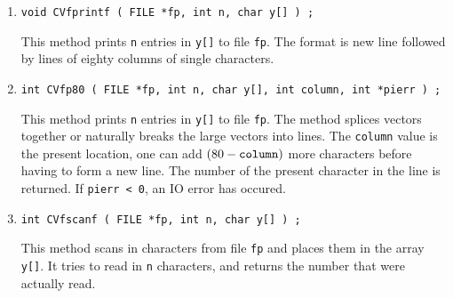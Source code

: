 \begin{enumerate}
{\tt y[i] = c} for {\tt 0 <= i < n}.
\item
\begin{verbatim}
void CVfprintf ( FILE *fp, int n, char y[] ) ;
\end{verbatim}
This method prints {\tt n} entries in {\tt y[]} to file {\tt fp}.
The format is new line followed by lines of eighty columns 
of single characters.
\item
\begin{verbatim}
int CVfp80 ( FILE *fp, int n, char y[], int column, int *pierr ) ;
\end{verbatim}
This method prints {\tt n} entries in {\tt y[]} to file {\tt fp}.
The method splices vectors together or naturally breaks the large
vectors into lines. 
The {\tt column} value is the present location, one can add $(80 -
\mbox{\tt column})$ more characters before having to form a new line.
The number of the present character in the line is returned.
If {\tt *pierr < 0}, an IO error has occured.
\item
\begin{verbatim}
int CVfscanf ( FILE *fp, int n, char y[] ) ;
\end{verbatim}
This method scans in characters from file {\tt fp} and places them
in the array {\tt y[]}.
It tries to read in {\tt n} characters, and returns the number
that were actually read.
\end{enumerate}
